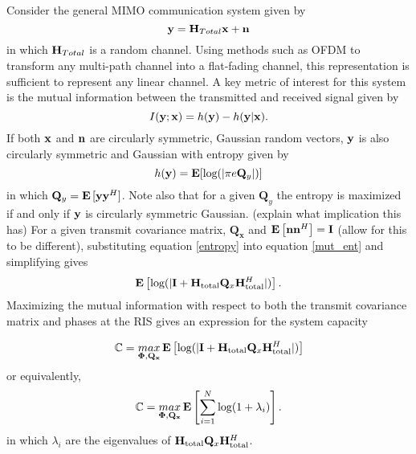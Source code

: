 Consider the general MIMO communication system given by 
	\begin{equation}\label{com_system}
	\mathbf{y} = \mathbf{H}_{Total}\mathbf{x} + \mathbf{n}
	\end{equation}
	in which $\mathbf{H}_{Total}$ is a random channel. Using methods such as OFDM to transform any multi-path channel into a flat-fading channel, this representation is sufficient to represent any linear channel.
A key metric of interest for this system is the mutual information between the transmitted and received signal given by 
\begin{equation}\label{mut_ent}
I(\mathbf{y};\mathbf{x}) = h(\mathbf{y}) - h(\mathbf{y}|\mathbf{x}).
\end{equation}
If both $\mathbf{x}$ and $\mathbf{n}$ are circularly symmetric, Gaussian random vectors, $\mathbf{y}$ is also circularly symmetric and Gaussian with entropy given by \cite{telatar1999capacity} 
\begin{equation}\label{entropy}
h(\mathbf{y}) = \mathop{\bf E{}}[\text{log{}}(|\pi e \mathbf{Q}_{y}|)]
\end{equation}
 in which $\mathbf{Q}_{y} = \mathop{\bf E{}}{[\mathbf{y} \mathbf{y}^H]}$. Note also that for a given $\mathbf{Q}_{y}$ the entropy is maximized if and only if $\mathbf{y}$ is circularly symmetric Gaussian. (explain what implication this has)
For a given transmit covariance matrix, $\mathbf{Q_x}$ and $\mathop{\bf E{}}\left[\mathbf{n}\mathbf{n}^H \right] = \mathbf{I}$ (allow for this to be different), substituting equation \eqref{entropy} into equation
\eqref{mut_ent} and simplifying gives
\begin{equation}\label{mut_inf}
\mathop{\bf E{}} \left[\text{log{}}(|\mathbf{I} + \mathbf{H}_\text{total} \mathbf{Q}_x \mathbf{H}_\text{total}^H|)\right].
\end{equation}
Maximizing the mutual information with respect to both the
transmit covariance matrix and phases at the RIS gives an expression for the system capacity

\begin{equation}\label{capacity}
\mathbb{C} = \underset{\boldsymbol{\Phi},\mathbf{Q_x}}{\mathop{max}} \mathop{\bf E{}} \left[\text{log{}}(|\mathbf{I} + \mathbf{H}_\text{total} \mathbf{Q}_x \mathbf{H}_\text{total}^H|)\right]
\end{equation}
or equivalently,
\begin{equation}\label{capacity_tricky}
\mathbb{C} = \underset{\boldsymbol{\Phi},\mathbf{Q_x}}{\mathop{max}} \mathop{\bf E{}} \left[\sum_{i=1}^{N}\text{log{}}(1 + \lambda_i)\right].
\end{equation}
in which $\lambda_i$ are the eigenvalues of $\mathbf{H}_\text{total} \mathbf{Q}_x \mathbf{H}_\text{total}^H$.

